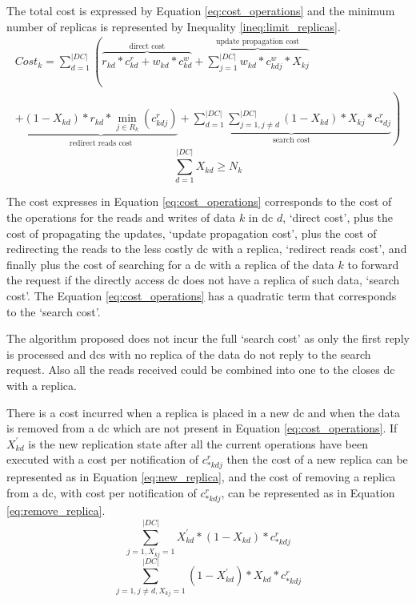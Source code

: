 \documentclass[english]{article}
\begin{document}
The total cost is expressed by Equation \ref{eq:cost_operations} and the minimum number of replicas is represented by Inequality \ref{ineq:limit_replicas}.
\begin{equation} \label{eq:cost_operations}
	\begin{split}
		 Cost_{k} = \sum^{|DC|}_{d = 1} \left( \overbrace{r_{kd} * c^{r}_{kd} + w_{kd} * c^{w}_{kd}}^\text{direct cost} + \overbrace{\sum^{|DC|}_{j = 1} w_{kd} * c^{w}_{kdj} * X_{kj}}^\text{update propagation cost} \right. \\ 
		 \left. + \underbrace{(1 - X_{kd}) * r_{kd} * \min_{j \in R_{k}}(c^{r}_{kdj})}_\text{redirect reads cost} + \underbrace{\sum^{|DC|}_{d = 1}  \sum^{|DC|}_{j = 1, j \neq d}  (1 - X_{kd}) * X_{kj} * c^{r}_{*dj}}_\text{search cost}\right)
	 \end{split}
\end{equation}
\begin{equation} \label{ineq:limit_replicas}
	\sum^{|DC|}_{d = 1} X_{kd} \ge N_{k} 
\end{equation}

The cost expresses in Equation \ref{eq:cost_operations} corresponds to the cost of the operations for the reads and writes of data $k$ in \gls{dc} $d$, `direct cost', plus the cost of propagating the updates, `update propagation cost', plus the cost of redirecting the reads to the less costly \gls{dc} with a replica, `redirect reads cost', and finally plus the cost of searching for a \gls{dc} with a replica of the data $k$ to forward the request if the directly access \gls{dc} does not have a replica of such data, `search cost'. The Equation \ref{eq:cost_operations} has a quadratic term that corresponds to the `search cost'.

The algorithm proposed does not incur the full `search cost' as only the first reply is processed and \glspl{dc} with no replica of the data do not reply to the search request. Also all the reads received could be combined into one to the closes \gls{dc} with a replica.

There is a cost incurred when a replica is placed in a new \gls{dc} and when the data is removed from a \gls{dc} which are not present in Equation \ref{eq:cost_operations}. If $X^{'}_{kd}$ is the new replication state after all the current operations have been executed with a cost per notification of $c^{r}_{*kdj}$ then the cost of a new replica can be represented as in Equation \ref{eq:new_replica}, and the cost of removing a replica from a \gls{dc}, with cost per notification of $c^{r}_{*kdj}$, can be represented as in Equation \ref{eq:remove_replica}.
\begin{equation} \label{eq:new_replica}
	\sum^{|DC|}_{j = 1, X_{kj} = 1} X^{'}_{kd} * (1 - X_{kd}) * c^{r}_{*kdj}
\end{equation}
\begin{equation} \label{eq:remove_replica}
	\sum^{|DC|}_{j = 1, j \neq d, X_{kj} = 1} (1 - X^{'}_{kd}) * X_{kd} * c^{r}_{*kdj}
\end{equation}
\end{document}
